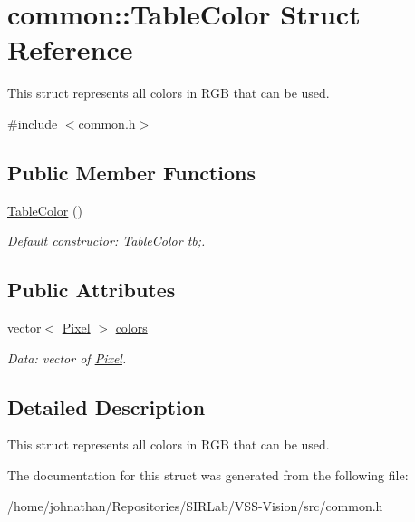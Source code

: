\hypertarget{structcommon_1_1TableColor}{}\section{common\+:\+:Table\+Color Struct Reference}
\label{structcommon_1_1TableColor}


This struct represents all colors in R\+GB that can be used.  




{\ttfamily \#include $<$common.\+h$>$}

\subsection*{Public Member Functions}
\begin{DoxyCompactItemize}
\item 
\hyperlink{structcommon_1_1TableColor_a08d8a7adc0b6462e2f78843dfd2e9b49}{Table\+Color} ()\hypertarget{structcommon_1_1TableColor_a08d8a7adc0b6462e2f78843dfd2e9b49}{}\label{structcommon_1_1TableColor_a08d8a7adc0b6462e2f78843dfd2e9b49}

\begin{DoxyCompactList}\small\item\em Default constructor\+: \hyperlink{structcommon_1_1TableColor}{Table\+Color} tb;. \end{DoxyCompactList}\end{DoxyCompactItemize}
\subsection*{Public Attributes}
\begin{DoxyCompactItemize}
\item 
vector$<$ \hyperlink{structcommon_1_1Pixel}{Pixel} $>$ \hyperlink{structcommon_1_1TableColor_a8ce253b484c9054445fcd4b3adc4726d}{colors}\hypertarget{structcommon_1_1TableColor_a8ce253b484c9054445fcd4b3adc4726d}{}\label{structcommon_1_1TableColor_a8ce253b484c9054445fcd4b3adc4726d}

\begin{DoxyCompactList}\small\item\em Data\+: vector of \hyperlink{structcommon_1_1Pixel}{Pixel}. \end{DoxyCompactList}\end{DoxyCompactItemize}


\subsection{Detailed Description}
This struct represents all colors in R\+GB that can be used. 

The documentation for this struct was generated from the following file\+:\begin{DoxyCompactItemize}
\item 
/home/johnathan/\+Repositories/\+S\+I\+R\+Lab/\+V\+S\+S-\/\+Vision/src/common.\+h\end{DoxyCompactItemize}
